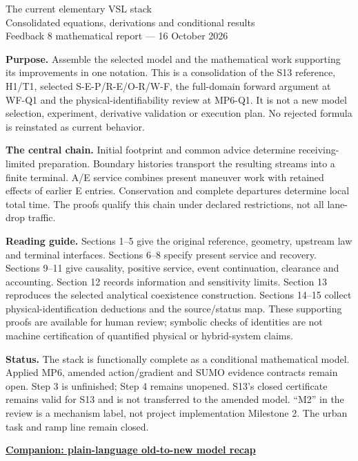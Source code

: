 \documentclass[11pt,a4paper]{article}
\begin{document}
\begin{center}
{\LARGE The current elementary VSL stack}\\[5pt]
{\large Consolidated equations, derivations and conditional results}\\[5pt]
Feedback 8 mathematical report --- 16 October 2026
\end{center}

\textbf{Purpose.} Assemble the selected model and the mathematical work
supporting its improvements in one notation. This is a consolidation of
the S13 reference, H1/T1, selected S-E-P/R-E/O-R/W-F, the full-domain
forward argument at WF-Q1 and the physical-identifiability review at MP6-Q1.
It is not a new model selection, experiment, derivative validation or
execution plan. No rejected formula is reinstated as current behavior.

\textbf{The central chain.} Initial footprint and common advice determine
receiving-limited preparation. Boundary histories transport the resulting
streams into a finite terminal. A/E service combines present maneuver work
with retained effects of earlier E entries. Conservation and complete
departures determine local total time. The proofs qualify this chain under
declared restrictions, not all lane-drop traffic.

\textbf{Reading guide.} Sections 1--5 give the original reference, geometry,
upstream law and terminal interfaces. Sections 6--8 specify present service
and recovery. Sections 9--11 give causality, positive service, event
continuation, clearance and accounting. Section 12 records information and
sensitivity limits. Section 13 reproduces the selected analytical coexistence
construction. Sections 14--15 collect physical-identification deductions
and the source/status map. These supporting proofs are available for human
review; symbolic checks of identities are not machine certification of
quantified physical or hybrid-system claims.

\textbf{Status.} The stack is functionally complete as a conditional
mathematical model. Applied MP6, amended action/gradient and SUMO evidence
contracts remain open. Step 3 is unfinished; Step 4 remains unopened.
S13's closed certificate remains valid for S13 and is not transferred to the
amended model. ``M2'' in the review is a mechanism label, not project
implementation Milestone 2. The urban task and ramp line remain closed.

\begin{center}
\href{vsl_feedback8_model_stack_recap.pdf}{\textbf{Companion: plain-language old-to-new model recap}}
\end{center}
\newpage
\tableofcontents
\newpage



\end{document}
